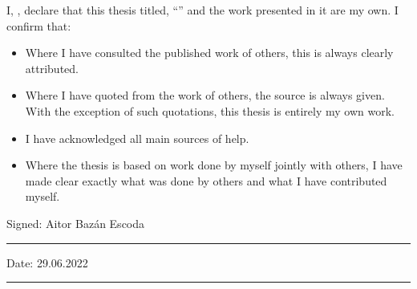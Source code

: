 \documentclass[
12pt, %
english, %
singlespacing, %
parskip, %
headsepline, %
consistentlayout, %
]{MastersDoctoralThesis} %
\begin{document}

\begin{declaration}
\addchaptertocentry{\authorshipname} %
\noindent I, \authorname, declare that this thesis titled, \enquote{\ttitle} and the work presented in it are my own. I confirm that:

\begin{itemize} 
\item Where I have consulted the published work of others, this is always clearly attributed.
\item Where I have quoted from the work of others, the source is always given. With the exception of such quotations, this thesis is entirely my own work.
\item I have acknowledged all main sources of help.
\item Where the thesis is based on work done by myself jointly with others, I have made clear exactly what was done by others and what I have contributed myself.\\
\end{itemize}
 
\noindent Signed: Aitor Bazán Escoda\\
\rule[0.5em]{25em}{0.5pt} %
 
\noindent Date: 29.06.2022\\
\rule[0.5em]{25em}{0.5pt} %
\end{declaration}



\end{document}
